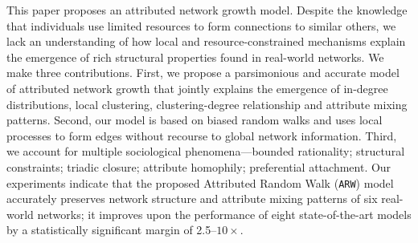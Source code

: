 
This paper proposes an attributed network growth model. Despite the knowledge
that individuals use limited resources to form connections to similar others, we
lack an understanding of how local and resource-constrained mechanisms explain the emergence of rich structural properties found in real-world networks. We make three contributions. First, we
propose a parsimonious and accurate model of attributed network growth that
jointly explains the emergence of in-degree distributions, local clustering,
clustering-degree relationship and attribute mixing patterns. Second, our model
is based on biased random walks and uses local processes to form edges without
recourse to global network information. Third, we account for multiple
sociological phenomena---bounded rationality; structural constraints; triadic
closure; attribute homophily; preferential attachment. Our experiments indicate
that the proposed Attributed Random Walk (\texttt{ARW}) model accurately
preserves network structure and attribute mixing patterns of six real-world
networks; it improves upon the performance of eight state-of-the-art models by a
statistically significant margin of 2.5--$10\times$.

%
%
